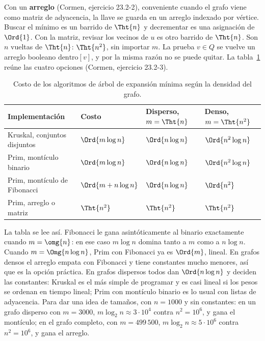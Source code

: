 \documentclass[11pt,letterpaper]{article}
\begin{document}
Con un \textbf{arreglo} (Cormen, ejercicio 23.2-2), conveniente cuando
el grafo viene como matriz de adyacencia, la llave se guarda en un
arreglo indexado por vértice. Buscar el mínimo es un barrido de
$\Tht{n}$ y decrementar es una asignación de $\Ord{1}$. Con la matriz,
revisar los vecinos de $u$ es otro barrido de $\Tht{n}$. Son $n$
vueltas de $\Tht{n}$: $\Tht{n^2}$, sin importar $m$. La prueba
$v \in Q$ se vuelve un arreglo booleano $\text{dentro}[v]$, y por la
misma razón no se puede quitar. La tabla~\ref{tab:costos-mst} reúne
las cuatro opciones (Cormen, ejercicio 23.2-3).

\begin{table}[H]
\centering
\small
\begin{tabular}{llll}
  \toprule
  \textbf{Implementación} & \textbf{Costo}
    & \textbf{Disperso, $m = \Tht{n}$} & \textbf{Denso, $m = \Tht{n^2}$} \\
  \midrule
  Kruskal, conjuntos disjuntos & $\Ord{m \log n}$ & $\Ord{n \log n}$
    & $\Ord{n^2 \log n}$ \\
  Prim, montículo binario & $\Ord{m \log n}$ & $\Ord{n \log n}$
    & $\Ord{n^2 \log n}$ \\
  Prim, montículo de Fibonacci & $\Ord{m + n \log n}$
    & $\Ord{n \log n}$ & $\Ord{n^2}$ \\
  Prim, arreglo o matriz & $\Tht{n^2}$ & $\Tht{n^2}$ & $\Tht{n^2}$ \\
  \bottomrule
\end{tabular}
\caption{Costo de los algoritmos de árbol de expansión mínima según la
         densidad del grafo.}
\label{tab:costos-mst}
\end{table}

La tabla se lee así. Fibonacci le gana asintóticamente al binario
exactamente cuando $m = \omg{n}$: en ese caso $m \log n$ domina tanto
a $m$ como a $n \log n$. Cuando $m = \Omg{n \log n}$, Prim con
Fibonacci ya es $\Ord{m}$, lineal. En grafos densos el arreglo empata
con Fibonacci y tiene constantes mucho menores, así que es la opción
práctica. En grafos dispersos todos dan $\Ord{n \log n}$ y deciden las
constantes: Kruskal es el más simple de programar y es casi lineal si
los pesos se ordenan en tiempo lineal; Prim con montículo binario es
lo usual con listas de adyacencia. Para dar una idea de tamaños, con
$n = 1000$ y sin constantes: en un grafo disperso con $m = 3000$,
$m \log_2 n \approx 3 \cdot 10^4$ contra $n^2 = 10^6$, y gana el
montículo; en el grafo completo, con $m = 499\,500$,
$m \log_2 n \approx 5 \cdot 10^6$ contra $n^2 = 10^6$, y gana el
arreglo.
\end{document}
